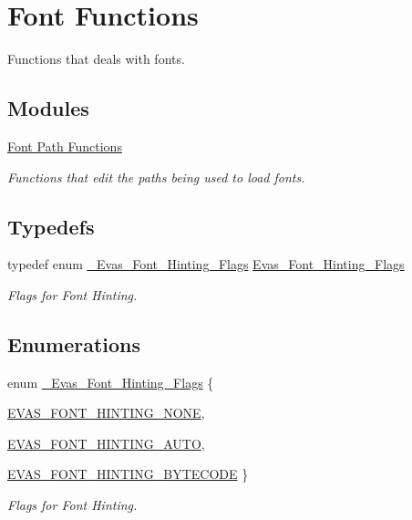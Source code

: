 \section{Font Functions}
\label{group__Evas__Font__Group}


Functions that deals with fonts.  


\subsection*{Modules}
\begin{DoxyCompactItemize}
\item 
\hyperlink{group__Evas__Font__Path__Group}{Font Path Functions}


\begin{DoxyCompactList}\small\item\em Functions that edit the paths being used to load fonts. \item\end{DoxyCompactList}

\end{DoxyCompactItemize}
\subsection*{Typedefs}
\begin{DoxyCompactItemize}
\item 
typedef enum \hyperlink{group__Evas__Font__Group_ga49208864211c97ac1a09f03318aa253c}{\_\-Evas\_\-Font\_\-Hinting\_\-Flags} \hyperlink{group__Evas__Font__Group_gaaed9273c1705a3d2356470c60b2f5aa5}{Evas\_\-Font\_\-Hinting\_\-Flags}
\begin{DoxyCompactList}\small\item\em Flags for Font Hinting. \item\end{DoxyCompactList}\end{DoxyCompactItemize}
\subsection*{Enumerations}
\begin{DoxyCompactItemize}
\item 
enum \hyperlink{group__Evas__Font__Group_ga49208864211c97ac1a09f03318aa253c}{\_\-Evas\_\-Font\_\-Hinting\_\-Flags} \{ \par
\hyperlink{group__Evas__Font__Group_gga49208864211c97ac1a09f03318aa253cabe20aa1c68be79f42ccfda9bc930c338}{EVAS\_\-FONT\_\-HINTING\_\-NONE}, 
\par
\hyperlink{group__Evas__Font__Group_gga49208864211c97ac1a09f03318aa253cac056b6ea8f7ad771b406e217e34b8440}{EVAS\_\-FONT\_\-HINTING\_\-AUTO}, 
\par
\hyperlink{group__Evas__Font__Group_gga49208864211c97ac1a09f03318aa253ca4731c09040a5e13aee4242483cc5a61e}{EVAS\_\-FONT\_\-HINTING\_\-BYTECODE}
 \}
\begin{DoxyCompactList}\small\item\em Flags for Font Hinting. \item\end{DoxyCompactList}\end{DoxyCompactItemize}
